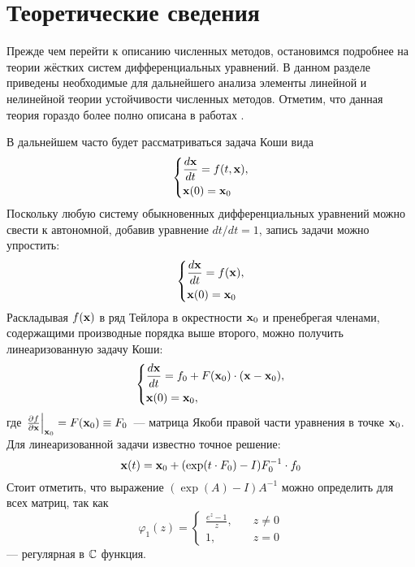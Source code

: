 \chapter{Теоретические сведения}
\label{chapter:theory} 

Прежде чем перейти к описанию численных методов, остановимся подробнее на теории жёстких систем дифференциальных уравнений.
В данном разделе приведены необходимые для дальнейшего анализа элементы линейной и нелинейной теории устойчивости численных методов.
Отметим, что данная теория гораздо более полно описана в работах \cite{heirer1999solvingode2, lambert1991methods}.

В дальнейшем часто будет рассматриваться задача Коши вида
%
\begin{equation}
    \label{eq:initial_value_problem}
    \begin{dcases}
        \frac{d \mathbf{x}}{d t} = f(t, \mathbf{x}), \\
        \mathbf{x}(0) = \mathbf{x}_0
    \end{dcases}
\end{equation}
%
Поскольку любую систему обыкновенных дифференциальных уравнений можно свести к автономной, добавив уравнение $ dt / dt = 1 $,
запись задачи можно упростить:
%
\begin{equation}
    \label{eq:autonomous_initial_value_problem}
    \begin{dcases}
        \frac{d \mathbf{x}}{d t} = f(\mathbf{x}), \\
        \mathbf{x}(0) = \mathbf{x}_0
    \end{dcases}
\end{equation}
%
Раскладывая $ f(\mathbf{x}) $ в ряд Тейлора в окрестности $ \mathbf{x}_0 $ и пренебрегая членами, содержащими производные порядка выше второго, можно получить линеаризованную задачу Коши:
%
\begin{equation}
    \label{eq:linearized_initial_value_problem}
    \begin{dcases}
        \frac{d \mathbf{x}}{d t} = f_0 + F(\mathbf{x}_0) \cdot (\mathbf{x} - \mathbf{x}_0), \\
        \mathbf{x}(0) = \mathbf{x}_0,
    \end{dcases}
\end{equation}
%
где $ \left. \frac{\partial f}{\partial \mathbf{x}} \right|_{\mathbf{x}_0} = F(\mathbf{x}_0) \equiv F_0 $~--- матрица Якоби правой части уравнения в точке $ \mathbf{x}_0 $.
Для линеаризованной задачи известно точное решение:
\begin{equation}
    \label{eq:linearized_solution}
    \mathbf{x}(t) = \mathbf{x}_0 + (\exp(t \cdot F_0) - I) F_0^{-1} \cdot f_0
\end{equation}
Стоит отметить, что выражение $ (\exp(A) - I) A^{-1} $ можно определить для всех матриц, так как
\begin{equation}
    \label{eq:phi_1_function}
    \varphi_1(z) =
    \begin{cases}
        \frac{e^z - 1}{z}, &\quad z \neq 0 \\
        1, &\quad z = 0
    \end{cases}
\end{equation}
--- регулярная в $ \mathbb{C} $ функция.


